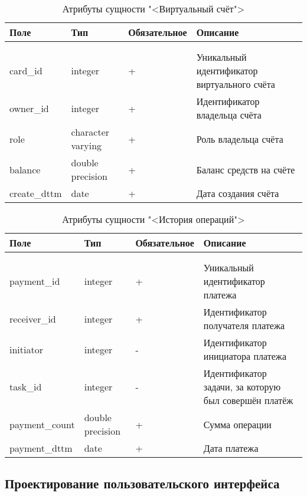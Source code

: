 \begin{xltabular}{\textwidth}{|l|l|p{1.7cm}|X|}
	\caption{Атрибуты сущности "<Виртуальный счёт">\label{pacc:table}}\\ \hline
	\centrow Поле & \centrow Тип & \centrow Обяза\-тельное & \centrow Описание \\ \hline
	 &  &  &  \\ \hline
	\endfirsthead
	 &  &  &  \\ \hline
	\finishhead
	card\_id & integer & + & Уникальный идентификатор виртуального счёта \\ \hline 
	owner\_id & integer & + & Идентификатор владельца счёта \\ \hline 
	role & character varying & + & Роль владельца счёта \\ \hline 
	balance & double precision & + & Баланс средств на счёте \\ \hline 
	create\_dttm & date & + & Дата создания счёта 
\end{xltabular}

\begin{xltabular}{\textwidth}{|l|l|p{1.7cm}|X|}
	\caption{Атрибуты сущности "<История операций">\label{payment:table}}\\ \hline
	\centrow Поле & \centrow Тип & \centrow Обяза\-тельное & \centrow Описание \\ \hline
	 &  &  &  \\ \hline
	\endfirsthead
	 &  &  &  \\ \hline
	\finishhead
	payment\_id & integer & + & Уникальный идентификатор платежа \\ \hline 
	receiver\_id & integer & + & Идентификатор получателя платежа \\ \hline 
	initiator & integer & - & Идентификатор инициатора платежа \\ \hline 
	task\_id & integer & - & Идентификатор задачи, за которую был совершён платёж \\ \hline
	payment\_count & double precision & + & Сумма операции \\ \hline 
	payment\_dttm & date & + & Дата платежа
\end{xltabular}

\subsection{Проектирование пользовательского интерфейса}

